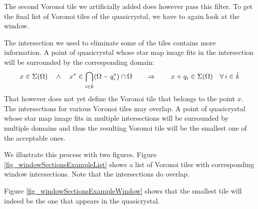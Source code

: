 \documentclass[text.tex]{subfiles}
\begin{document}
The second Voronoi tile we artificially added does however pass this filter. To get the final list of Voronoi tiles of the quasicrystal, we have to again look at the window. 

The intersection we used to eliminate some of the tiles contains more information. A point of quasicrystal whose star map image fits in the intersection will be surrounded by the corresponding domain: 
$$x\in\Sigma(\Omega) \quad\wedge\quad x^\ast\in\bigcap\limits_{i\in\hat{k}}(\Omega-q_i^\ast)\cap\Omega \qquad\Rightarrow\qquad x+q_i\in\Sigma(\Omega)\quad\forall\,i\in\hat{k}$$
That however does not yet define the Voronoi tile that belongs to the point $x$. The intersections for various Voronoi tiles may overlap. A point of quasicrystal whose star map image fits in multiple intersections will be surrounded by multiple domains and thus the resulting Voronoi tile will be the smallest one of the acceptable ones. 

We illustrate this process with two figures. Figure \ref{fig_windowSectionsExampleList} shows a list of Voronoi tiles with corresponding window intersections. Note that the intersections do overlap. 

Figure \ref{fig_windowSectionsExampleWindow} shows that the smallest tile will indeed be the one that appears in the quasicrystal. 
\end{document}
